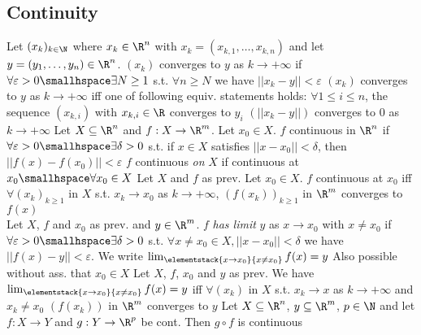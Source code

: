 \subsection{Continuity}
 Let $(x_k)_{k \in \N}$ where $x_k \in \R^n$ with $x_k = (x_{k, 1}, \ldots, x_{k, n})$ and let $y = (y_1, \ldots, y_n) \in \R^n$.
$(x_k)$ converges to $y$ as $k \rightarrow +\infty$ if $\forall \varepsilon > 0 \smallhspace \exists N \geq 1$ s.t. $\forall n \geq N$ we have $||x_k - y|| < \varepsilon$
\shortlemma $(x_k)$ converges to $y$ as $k \rightarrow +\infty$ iff one of following equiv. statements holds:
 $\forall 1 \leq i \leq n$, the sequence $(x_{k, i})$ with $x_{k, i} \in \R$ converges to $y_i$
 $(||x_k - y||)$ converges to $0$ as $k \rightarrow +\infty$
 Let $X \subseteq \R^n$ and $f: X \rightarrow \R^m$.
 Let $x_0 \in X$. $f$ continuous in $\R^n$ if $\forall \varepsilon > 0 \smallhspace \exists \delta > 0$ s.t. if $x \in X$ satisfies $||x - x_0|| < \delta$,
then $||f(x) - f(x_0)|| < \varepsilon$
 $f$ continuous \textit{on} $X$ if continuous at $x_0 \smallhspace \forall x_0 \in X$
\shortproposition Let $X$ and $f$ as prev. Let $x_0 \in X$. $f$ continuous at $x_0$ iff $\forall (x_k)_{k \geq 1}$ in $X$ s.t.
$x_k \rightarrow x_0$ as $k \rightarrow +\infty$, $(f(x_k))_{k \geq 1}$ in $\R^m$ converges to $f(x)$\\
 Let $X$, $f$ and $x_0$ as prev. and $y \in \R^m$. $f$ \textit{has limit} $y$ as $x \rightarrow x_0$ with $x \neq x_0$ if
$\forall \varepsilon > 0 \smallhspace \exists \delta > 0$ s.t. $\forall x \neq x_0 \in X, ||x - x_0|| < \delta$ we have $||f(x) - y|| < \varepsilon$.
We write $\lim_{\elementstack{x \rightarrow x_0}{x \neq x_0}} f(x) = y$
\shortremark Also possible without ass. that $x_0 \in X$
\shortproposition Let $X$, $f$, $x_0$ and $y$ as prev. We have $\lim_{\elementstack{x \rightarrow x_0}{x \neq x_0}} f(x) = y$ 
iff $\forall (x_k)$ in $X$ s.t. $x_k \rightarrow x$ as $k \rightarrow +\infty$ and $x_k \neq x_0$ $(f(x_k))$ in $\R^m$ converges to $y$
\shortproposition Let $X \subseteq \R^n$, $y \subseteq \R^m$, $p \in \N$ and let $f: X \rightarrow Y$ and $g: Y \rightarrow \R^p$ be cont. Then $g \circ f$ is continuous
